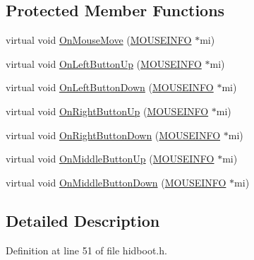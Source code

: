 \subsection*{\-Protected \-Member \-Functions}
\begin{DoxyCompactItemize}
\item 
virtual void \hyperlink{class_mouse_report_parser_a3e231baff6196df63dbad9a44f4945a7}{\-On\-Mouse\-Move} (\hyperlink{struct_m_o_u_s_e_i_n_f_o}{\-M\-O\-U\-S\-E\-I\-N\-F\-O} $\ast$mi)
\item 
virtual void \hyperlink{class_mouse_report_parser_a6e640919bf67e70c66f1dcbee5798e45}{\-On\-Left\-Button\-Up} (\hyperlink{struct_m_o_u_s_e_i_n_f_o}{\-M\-O\-U\-S\-E\-I\-N\-F\-O} $\ast$mi)
\item 
virtual void \hyperlink{class_mouse_report_parser_accfab93f9a2ba8fa0998437dcca44086}{\-On\-Left\-Button\-Down} (\hyperlink{struct_m_o_u_s_e_i_n_f_o}{\-M\-O\-U\-S\-E\-I\-N\-F\-O} $\ast$mi)
\item 
virtual void \hyperlink{class_mouse_report_parser_a1bdfee565073cd8b77cbeb9e184c174f}{\-On\-Right\-Button\-Up} (\hyperlink{struct_m_o_u_s_e_i_n_f_o}{\-M\-O\-U\-S\-E\-I\-N\-F\-O} $\ast$mi)
\item 
virtual void \hyperlink{class_mouse_report_parser_a6884349e6b2de0cbfedf3e1a77c23870}{\-On\-Right\-Button\-Down} (\hyperlink{struct_m_o_u_s_e_i_n_f_o}{\-M\-O\-U\-S\-E\-I\-N\-F\-O} $\ast$mi)
\item 
virtual void \hyperlink{class_mouse_report_parser_a7512c9a85581aa4be52a780d7c91f655}{\-On\-Middle\-Button\-Up} (\hyperlink{struct_m_o_u_s_e_i_n_f_o}{\-M\-O\-U\-S\-E\-I\-N\-F\-O} $\ast$mi)
\item 
virtual void \hyperlink{class_mouse_report_parser_ad1c06ea106608bd3dcb5c90ecc487ac9}{\-On\-Middle\-Button\-Down} (\hyperlink{struct_m_o_u_s_e_i_n_f_o}{\-M\-O\-U\-S\-E\-I\-N\-F\-O} $\ast$mi)
\end{DoxyCompactItemize}


\subsection{\-Detailed \-Description}


\-Definition at line 51 of file hidboot.\-h.



